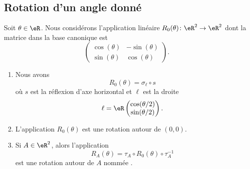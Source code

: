 \subsection{Rotation d'un angle donné}

\begin{lemmaDef}        \label{DEFooADTDooKIZbrw}
    Soit \( \theta\in \eR\). Nous considérons l'application linéaire \( R_0(\theta)\colon \eR^2\to \eR^2\) dont la matrice dans la base canonique est
    \begin{equation}
        \begin{pmatrix}
            \cos(\theta)    &   -\sin(\theta)    \\ 
            \sin(\theta)    &   \cos(\theta)    
        \end{pmatrix}.
    \end{equation}
    \begin{enumerate}
        \item       \label{ITEMooIEKJooZfsAui}
    Nous avons
    \begin{equation}        \label{EQooEVCTooBpTDDq}
        R_0(\theta)=\sigma_{\ell}\circ s
    \end{equation}
    où \( s\) est la réflexion d'axe horizontal et \( \ell\) est la droite
    \begin{equation}
        \ell=\eR\begin{pmatrix}
            \cos(\theta/2)    \\ 
            \sin(\theta/2)    
        \end{pmatrix}.
    \end{equation}
\item       \label{ITEMooBEYOooMHRRYk}
    L'application \( R_0(\theta)\) est une rotation autour de \( (0,0)\).
\item     \label{ITEMooEQPAooQcsYfj}
          Si \( A\in \eR^2\), alors l'application
          \begin{equation}
              R_A(\theta)=\tau_A\circ R_0(\theta)\circ \tau_A^{-1}
          \end{equation}
            est une rotation autour de \( A\) nommée .       
    \end{enumerate}
\end{lemmaDef}

